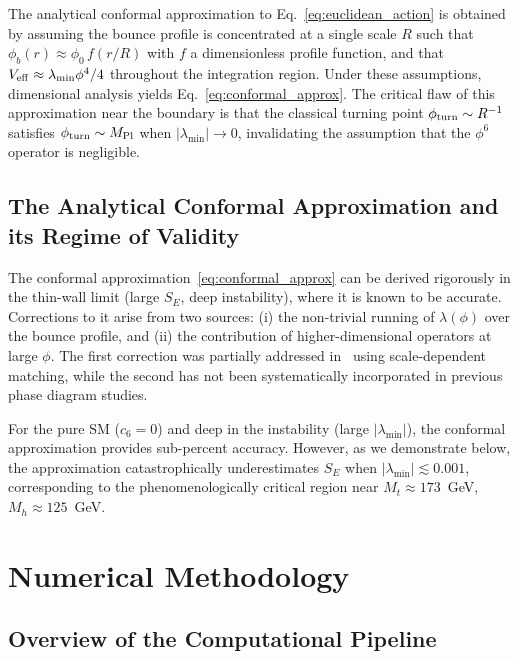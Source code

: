 \documentclass[aps,prd,twocolumn,superscriptaddress,nofootinbib]{revtex4-2}
\begin{document}
The analytical conformal approximation to Eq.~\eqref{eq:euclidean_action}
is obtained by assuming the bounce profile is concentrated at a single
scale $R$ such that $\phi_b(r) \approx \phi_0\,f(r/R)$ with $f$ a
dimensionless profile function, and that $V_{\rm eff} \approx \lambda_{\min}\phi^4/4$
throughout the integration region. Under these assumptions, dimensional
analysis yields Eq.~\eqref{eq:conformal_approx}. The critical flaw of this
approximation near the boundary is that the classical turning point
$\phi_{\rm turn} \sim R^{-1}$ satisfies $\phi_{\rm turn} \sim M_{\rm Pl}$
when $|\lambda_{\min}| \to 0$, invalidating the assumption that the $\phi^6$
operator is negligible.

\subsection{The Analytical Conformal Approximation and its Regime of Validity}
\label{subsec:validity}

The conformal approximation~\eqref{eq:conformal_approx} can be derived
rigorously in the thin-wall limit (large $S_E$, deep instability), where
it is known to be accurate. Corrections to it arise from two sources:
(i) the non-trivial running of $\lambda(\phi)$ over the bounce profile, and
(ii) the contribution of higher-dimensional operators at large $\phi$.
The first correction was partially addressed in~\cite{Isidori:2001bm} using
scale-dependent matching, while the second has not been systematically
incorporated in previous phase diagram studies.

For the pure SM ($c_6 = 0$) and deep in the instability (large $|\lambda_{\min}|$),
the conformal approximation provides sub-percent accuracy. However, as we
demonstrate below, the approximation catastrophically underestimates $S_E$
when $|\lambda_{\min}| \lesssim 0.001$, corresponding to the phenomenologically
critical region near $M_t \approx 173$~GeV, $M_h \approx 125$~GeV.

\section{Numerical Methodology}
\label{sec:numerics}

\subsection{Overview of the Computational Pipeline}
\label{subsec:pipeline}
\end{document}
